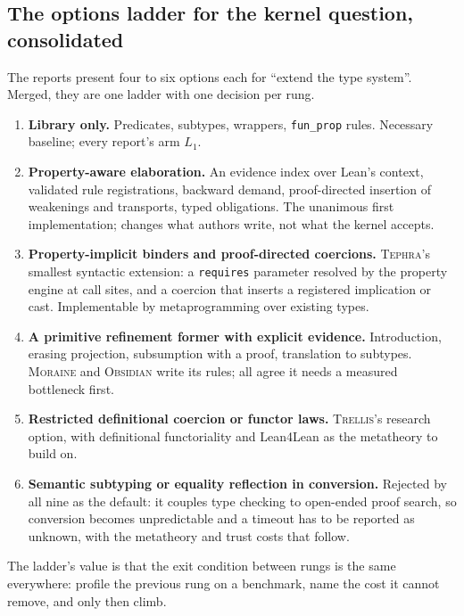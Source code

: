 \documentclass[11pt,a4paper]{article}
\newcommand{\code}[1]{\nolinkurl{#1}}
\newcommand{\Mr}{\textsc{Moraine}}
\newcommand{\Ob}{\textsc{Obsidian}}
\newcommand{\Tp}{\textsc{Tephra}}
\newcommand{\Tr}{\textsc{Trellis}}
\theoremstyle{definition}
\begin{document}
\subsection{The options ladder for the kernel question, consolidated}\label{sec:ladder}
The reports present four to six options each for ``extend the type system''. Merged, they are one ladder with one decision per rung.
\begin{enumerate}
\item \textbf{Library only.} Predicates, subtypes, wrappers, \code{fun_prop} rules. Necessary baseline; every report's arm $L_1$.
\item \textbf{Property-aware elaboration.} An evidence index over Lean's context, validated rule registrations, backward demand, proof-directed insertion of weakenings and transports, typed obligations. The unanimous first implementation; changes what authors write, not what the kernel accepts.
\item \textbf{Property-implicit binders and proof-directed coercions.} \Tp's smallest syntactic extension: a \code{requires} parameter resolved by the property engine at call sites, and a coercion that inserts a registered implication or cast. Implementable by metaprogramming over existing types.
\item \textbf{A primitive refinement former with explicit evidence.} Introduction, erasing projection, subsumption with a proof, translation to subtypes. \Mr{} and \Ob{} write its rules; all agree it needs a measured bottleneck first.
\item \textbf{Restricted definitional coercion or functor laws.} \Tr's research option, with definitional functoriality and Lean4Lean as the metatheory to build on.
\item \textbf{Semantic subtyping or equality reflection in conversion.} Rejected by all nine as the default: it couples type checking to open-ended proof search, so conversion becomes unpredictable and a timeout has to be reported as unknown, with the metatheory and trust costs that follow.
\end{enumerate}
The ladder's value is that the exit condition between rungs is the same everywhere: profile the previous rung on a benchmark, name the cost it cannot remove, and only then climb.
\end{document}
